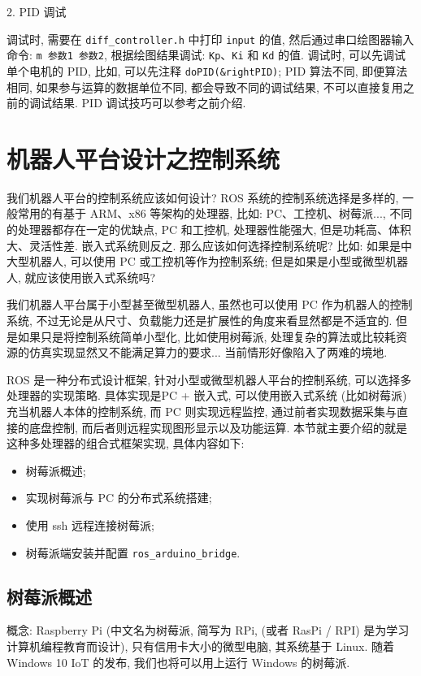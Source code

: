\documentclass[openany, fontset=windowsold]{ctexbook}
\theoremstyle{kaiti}
\theoremstyle{normal}
\begin{document}
2. PID 调试

调试时, 需要在 \verb|diff_controller.h| 中打印 \verb|input| 的值, 然后通过串口绘图器输入命令: \verb|m 参数1 参数2|, 根据绘图结果调试: \verb|Kp|、\verb|Ki| 和 \verb|Kd| 的值. 调试时, 可以先调试单个电机的 PID, 比如, 可以先注释 \verb|doPID(&rightPID)|; PID 算法不同, 即便算法相同, 如果参与运算的数据单位不同, 都会导致不同的调试结果, 不可以直接复用之前的调试结果. PID 调试技巧可以参考之前介绍.

\section{机器人平台设计之控制系统}

我们机器人平台的控制系统应该如何设计? ROS 系统的控制系统选择是多样的, 一般常用的有基于 ARM、x86 等架构的处理器, 比如: PC、工控机、树莓派..., 不同的处理器都存在一定的优缺点, PC 和工控机, 处理器性能强大, 但是功耗高、体积大、灵活性差. 嵌入式系统则反之. 那么应该如何选择控制系统呢? 比如: 如果是中大型机器人, 可以使用 PC 或工控机等作为控制系统; 但是如果是小型或微型机器人, 就应该使用嵌入式系统吗? 

我们机器人平台属于小型甚至微型机器人, 虽然也可以使用 PC 作为机器人的控制系统, 不过无论是从尺寸、负载能力还是扩展性的角度来看显然都是不适宜的. 但是如果只是将控制系统简单小型化, 比如使用树莓派, 处理复杂的算法或比较耗资源的仿真实现显然又不能满足算力的要求... 当前情形好像陷入了两难的境地.

ROS 是一种分布式设计框架, 针对小型或微型机器人平台的控制系统, 可以选择多处理器的实现策略. 具体实现是PC + 嵌入式, 可以使用嵌入式系统 (比如树莓派) 充当机器人本体的控制系统, 而 PC 则实现远程监控, 通过前者实现数据采集与直接的底盘控制, 而后者则远程实现图形显示以及功能运算. 本节就主要介绍的就是这种多处理器的组合式框架实现, 具体内容如下:

\begin{itemize}
  \item 树莓派概述; 
  \item 实现树莓派与 PC 的分布式系统搭建; 
  \item 使用 ssh 远程连接树莓派; 
  \item 树莓派端安装并配置 \verb|ros_arduino_bridge|.
\end{itemize}

\subsection{树莓派概述}

概念: Raspberry Pi (中文名为树莓派, 简写为 RPi, (或者 RasPi / RPI) 是为学习计算机编程教育而设计), 只有信用卡大小的微型电脑, 其系统基于 Linux. 随着 Windows 10 IoT 的发布, 我们也将可以用上运行 Windows 的树莓派.
\end{document}

